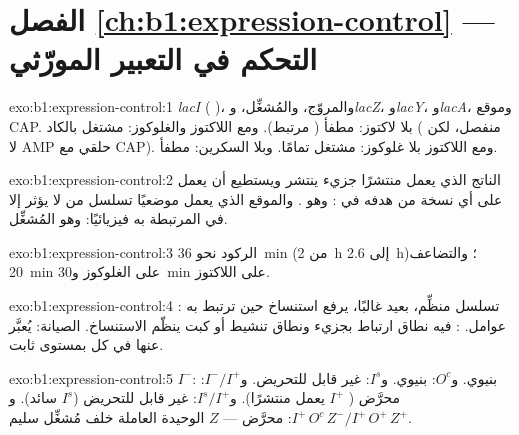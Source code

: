\section*{الفصل \ref{ch:b1:expression-control} --- التحكم في التعبير المورّثي}

\begin{solution}{exo:b1:expression-control:1}
\emph{lacI} ( )، والمروّج، والمُشغِّل، و\emph{lacZ}،
و\emph{lacY}، و\emph{lacA}، وموقع CAP. بلا لاكتوز: مطفأ (
مرتبط). ومع اللاكتوز والغلوكوز: مشتغل بالكاد ( منفصل، لكن لا
AMP حلقي مع CAP). ومع اللاكتوز بلا غلوكوز: مشتغل تمامًا. وبلا
السكرين: مطفأ.
\end{solution}

\begin{solution}{exo:b1:expression-control:2}
الناتج الذي يعمل منتشرًا جزيء ينتشر ويستطيع أن يعمل على أي نسخة من
هدفه في : وهو . والموقع الذي يعمل موضعيًا تسلسل من 
لا يؤثر إلا في  المرتبطة به فيزيائيًا: وهو المُشغِّل.
\end{solution}

\begin{solution}{exo:b1:expression-control:3}
الركود نحو \qty{36}{min} (من \qty{2}{h} إلى \qty{2.6}{h})؛ والتضاعف
\qty{20}{min} على الغلوكوز و\qty{30}{min} على اللاكتوز.
\end{solution}

\begin{solution}{exo:b1:expression-control:4}
: تسلسل منظِّم، بعيد غالبًا، يرفع استنساخ  حين ترتبط
به عوامل. :  فيه نطاق ارتباط بجزيء  ونطاق
تنشيط أو كبت ينظّم الاستنساخ.  الصيانة:  يُعبَّر عنها
في كل  بمستوى ثابت.
\end{solution}

\begin{solution}{exo:b1:expression-control:5}
$I^-$: بنيوي. و$O^c$: بنيوي. و$I^s$: غير قابل للتحريض.
و$I^-/I^+$: محرَّض ( $I^+$ يعمل منتشرًا). و$I^s/I^+$:
غير قابل للتحريض ($I^s$ سائد). و$I^+\,O^c\,Z^- / I^+\,O^+\,Z^+$: محرَّض
---  $Z$ الوحيدة العاملة خلف مُشغِّل سليم.
\end{solution}


